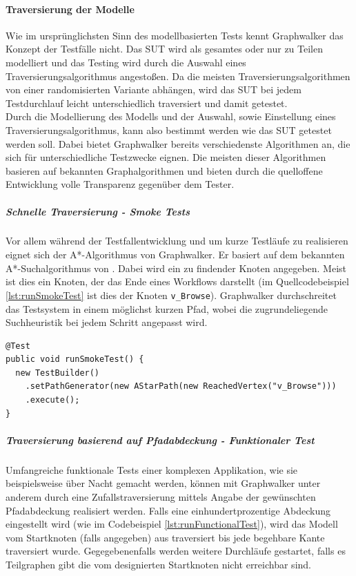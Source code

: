 \paragraph{Traversierung der Modelle} 
\label{sec:graphwalker_traversierung} 
Wie im ursprünglichsten Sinn des modellbasierten Tests kennt Graphwalker das Konzept der Testfälle nicht. Das \Gls{SUT} wird als gesamtes oder nur zu Teilen modelliert und das Testing wird durch die Auswahl eines Traversierungsalgorithmus angestoßen. Da die meisten Traversierungsalgorithmen von einer randomisierten Variante abhängen, wird das \Gls{SUT} bei jedem Testdurchlauf leicht unterschiedlich traversiert und damit getestet.\\
Durch die Modellierung des Modells und der Auswahl, sowie Einstellung eines Traversierungsalgorithmus, kann also bestimmt werden wie das \Gls{SUT} getestet werden soll. Dabei bietet Graphwalker bereits verschiedenste Algorithmen an, die sich für unterschiedliche Testzwecke eignen. Die meisten dieser Algorithmen basieren auf bekannten Graphalgorithmen und bieten durch die quelloffene Entwicklung volle Transparenz gegenüber dem Tester.

\subparagraph{Schnelle Traversierung - Smoke Tests}
Vor allem während der Testfallentwicklung und um kurze Testläufe zu realisieren eignet sich der A*-Algorithmus von Graphwalker. Er basiert auf dem bekannten A*-Suchalgorithmus von \citeauthor{hart_formal_1968} \cite{hart_formal_1968}. Dabei wird ein zu findender Knoten angegeben. Meist ist dies ein Knoten, der das Ende eines Workflows darstellt (im Quellcodebeispiel \ref{lst:runSmokeTest} ist dies der Knoten \texttt{v\_Browse}). Graphwalker durchschreitet das Testsystem in einem möglichst kurzen Pfad, wobei die zugrundeliegende Suchheuristik bei jedem Schritt angepasst wird.

\begin{lstlisting}[caption={Initialisierung eines Graphwalker Tests basierend auf dem A*-Suchalgorithmus.}, label=lst:runSmokeTest]
@Test
public void runSmokeTest() {
  new TestBuilder()
    .setPathGenerator(new AStarPath(new ReachedVertex("v_Browse")))
    .execute();
}
\end{lstlisting}

\subparagraph{Traversierung basierend auf Pfadabdeckung - Funktionaler Test}
Umfangreiche funktionale Tests einer komplexen Applikation, wie sie beispielsweise über Nacht gemacht werden, können mit Graphwalker unter anderem durch eine Zufallstraversierung mittels Angabe der gewünschten Pfadabdeckung realisiert werden. Falls eine einhundertprozentige Abdeckung eingestellt wird (wie im Codebeispiel \ref{lst:runFunctionalTest}), wird das Modell vom Startknoten (falls angegeben) aus traversiert bis jede begehbare Kante traversiert wurde. Gegegebenenfalls werden weitere Durchläufe gestartet, falls es Teilgraphen gibt die vom designierten Startknoten nicht erreichbar sind. 

